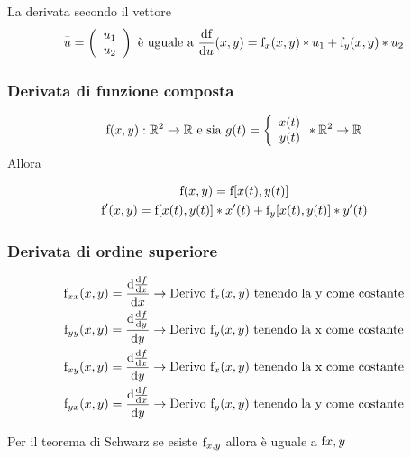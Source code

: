 La derivata secondo il vettore
\[
\overset{\scriptscriptstyle-}{u}=\left({
\begin{array}{c}
  {u_1}\\
  {u_2}\\
\end{array}
}\right)
\text{ è uguale a }
\frac{{\rm d}\text{\text{f}}}{{\rm d}u}(x,y)=\text{\text{f}}_x(x,y)*u_1+\text{\text{f}}_y(x,y)*u_2
\]
\subsubsection{Derivata di funzione composta}
\[
\text{\text{f}}(x,y):\mathbb{R}^2\to\mathbb{R} 
\text{ e sia }
 g(t)= \bigg \{
\begin{array}{rl}
x(t)\\
y(t)\\
\end{array}*\mathbb{R}^2\to\mathbb{R}
\]
Allora

\begin{gather*}
\text{f}(x,y)=\text{f}[x(t),y(t)]\\
{\text{f}}'(x,y)=\text{f}[x(t),y(t)]*x'(t)+{\text{f}}_y[x(t),y(t)]*y'(t)
\end{gather*}

\subsubsection{Derivata di ordine superiore}

\begin{gather}
{\text{f}}_{xx}(x,y)=\frac{{\rm d}\frac{{\rm d}f}{{\rm d}x}}{{\rm d}x}\to\text{Derivo \text{f}}_x(x,y)\text{ tenendo la y come costante}\\
{\text{f}}_{yy}(x,y)=\frac{{\rm d}\frac{{\rm d}f}{{\rm d}y}}{{\rm d}y}\to\text{Derivo \text{f}}_y(x,y)\text{ tenendo la x come costante}\\
{\text{f}}_{xy}(x,y)=\frac{{\rm d}\frac{{\rm d}f}{{\rm d}x}}{{\rm d}y}\to\text{Derivo \text{f}}_x(x,y)\text{ tenendo la x come costante}\\
{\text{f}}_{yx}(x,y)=\frac{{\rm d}\frac{{\rm d}f}{{\rm d}x}}{{\rm d}y}\to\text{Derivo \text{f}}_y(x,y)\text{ tenendo la y come costante}\\
\end{gather}

Per il teorema di Schwarz se esiste ${\text{f}}_{x,y}$ allora è uguale a $\text{f}{x,y}$
